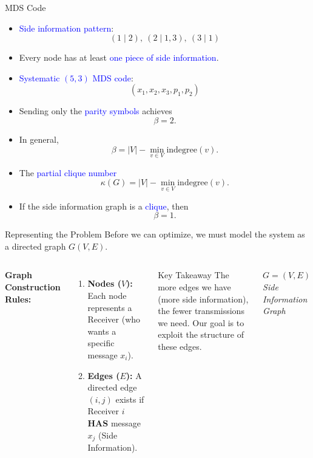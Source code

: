 \documentclass[aspectratio=169,xcolor=dvipsnames]{beamer}
\begin{document}
	\begin{frame}{MDS Code}
		
		\begin{itemize}
			\item \textcolor{blue}{Side information pattern}:
			\[
			(1 \mid 2), \ (2 \mid 1,3), \ (3 \mid 1)
			\]
			
			\item Every node has at least \textcolor{blue}{one piece of side information}.
			
			\item \textcolor{blue}{Systematic $(5,3)$ MDS code}:
			\[
			(x_1, x_2, x_3, p_1, p_2)
			\]
			
			\item Sending only the \textcolor{blue}{parity symbols} achieves
			\[
			\beta = 2.
			\]
			
			\item In general,
			\[
			\beta = |V| - \min_{v \in V} \text{indegree}(v).
			\]
			
			\item The \textcolor{blue}{partial clique number}
			\[
			\kappa(G) = |V| - \min_{v \in V} \text{indegree}(v).
			\]
			
			\item If the side information graph is a \textcolor{blue}{clique}, then
			\[
			\beta = 1.
			\]
		\end{itemize}
		
	\end{frame}
	
	\begin{frame}{Representing the Problem}
		Before we can optimize, we must model the system as a directed graph $G(V, E)$.
		
		\vspace{1em}
		
		\begin{columns}[c]
			\textbf{Graph Construction Rules:}
			\begin{enumerate}
				\item \textbf{Nodes ($V$):} Each node represents a Receiver (who wants a specific message $x_i$).
				\item \textbf{Edges ($E$):} A directed edge $(i, j)$ exists if Receiver $i$ \textbf{HAS} message $x_j$ (Side Information).
			\end{enumerate}
			
			\vspace{1em}
			\begin{block}{Key Takeaway}
				The more edges we have (more side information), the fewer transmissions we need. Our goal is to exploit the structure of these edges.
			\end{block}
			
			\centering
			\Huge $G = (V, E)$
			\vspace{0.5em}
			\normalsize
			\\ \textit{Side Information Graph}
		\end{columns}
	\end{frame}
	
\end{document}
